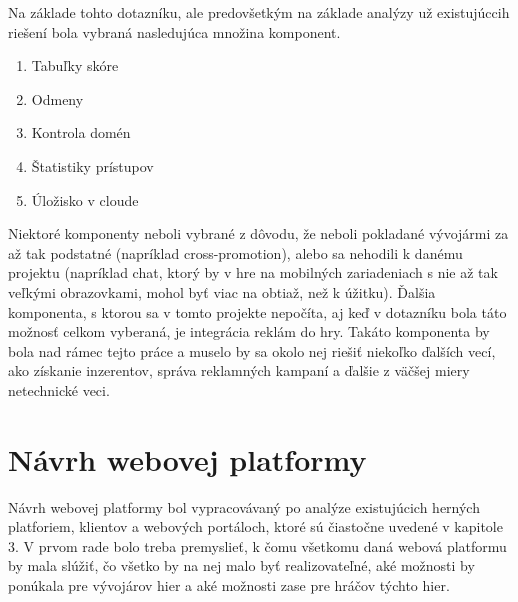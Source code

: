 Na základe tohto dotazníku, ale predovšetkým na základe analýzy už existujúccih riešení bola vybraná nasledujúca množina komponent.
\begin{enumerate}
\item Tabuľky skóre
\item Odmeny
\item Kontrola domén
\item Štatistiky prístupov
\item Úložisko v cloude
\end{enumerate}
Niektoré komponenty neboli vybrané z dôvodu, že neboli pokladané vývojármi za až tak podstatné (napríklad cross-promotion), alebo sa nehodili k danému projektu (napríklad chat, ktorý by v hre na mobilných zariadeniach s nie až tak veľkými obrazovkami, mohol byť viac na obtiaž, než k úžitku). Ďalšia komponenta, s ktorou sa v tomto projekte nepočíta, aj keď v dotazníku bola táto možnosť celkom vyberaná, je integrácia reklám do hry. Takáto komponenta by bola nad rámec tejto práce a muselo by sa okolo nej riešiť niekoľko ďalších vecí, ako získanie inzerentov, správa reklamných kampaní a ďalšie z väčšej miery netechnické veci.

\section{Návrh webovej platformy}
Návrh webovej platformy bol vypracovávaný po analýze existujúcich herných platforiem, klientov a webových portáloch, ktoré sú čiastočne uvedené v kapitole 3. V prvom rade bolo treba premyslieť, k čomu všetkomu daná webová platformu by mala slúžiť, čo všetko by na nej malo byť realizovateľné, aké možnosti by ponúkala pre vývojárov hier a aké možnosti zase pre hráčov týchto hier. 

